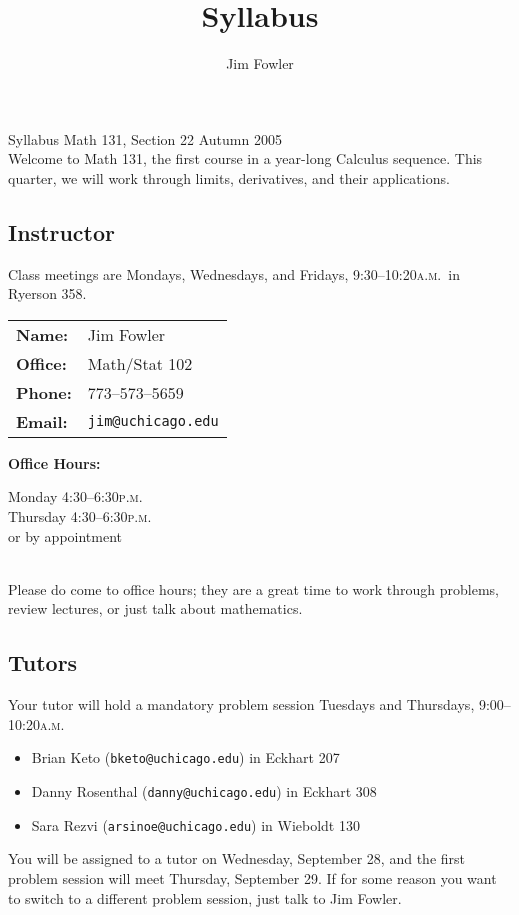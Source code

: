 \documentclass[12pt,letterpaper]{article}
\title{Syllabus}
\author{Jim Fowler}
\newcommand{\peem}{\textsc{p.m.}}
\newcommand{\ayem}{\textsc{a.m.}}
\begin{document}
{\Large\sf Syllabus\hfill
Math 131, Section 22\hfill
Autumn 2005} \\

Welcome to Math 131, the first course in a year-long Calculus
sequence.  This quarter, we will work through limits, derivatives, and
their applications.

\vfill
\subsection*{Instructor}
Class meetings are Mondays, Wednesdays, and Fridays, 9:30--10:20\ayem\ in Ryerson 358. \\

\parbox{0.5\textwidth}
{\begin{tabular}{ll}
\textbf{Name:} & Jim Fowler \\
\textbf{Office:} & Math/Stat 102 \\
\textbf{Phone:} & 773--573--5659 \\
\textbf{Email:} & \texttt{jim@uchicago.edu}
\end{tabular}
}\parbox{0.5\textwidth}{
\textbf{Office Hours:} \parbox[t]{0.3\textwidth}{Monday 4:30--6:30\peem \\ Thursday 4:30--6:30\peem \\ or by appointment}} \\

\vspace{2ex} Please do come to office hours; they are a great time to work
through problems, review lectures, or just talk about mathematics.

\vfill
\subsection*{Tutors}
Your tutor will hold a mandatory problem session Tuesdays and Thursdays, 9:00--10:20\ayem
\begin{itemize}
\setlength{\itemsep}{-1ex}
\item Brian Keto (\texttt{bketo@uchicago.edu}) in Eckhart 207
\item Danny Rosenthal (\texttt{danny@uchicago.edu}) in Eckhart 308 
\item Sara Rezvi (\texttt{arsinoe@uchicago.edu}) in Wieboldt 130
\end{itemize}
You will be assigned to a tutor on Wednesday, September 28, and the
first problem session will meet Thursday, September 29.  If for some
reason you want to switch to a different problem session, just talk to
Jim Fowler.
\end{document}
